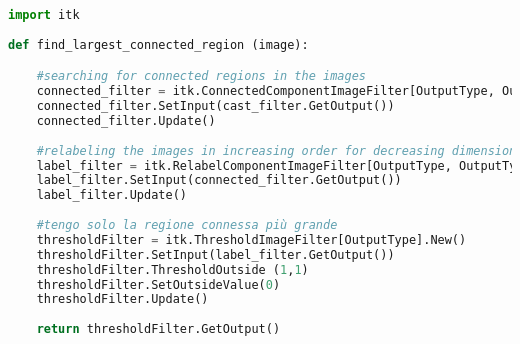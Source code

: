 \documentclass{standalone}
\begin{document}
\lstset{style=python}
	\begin{lstlisting}[language=python, caption = Largest Connected Region Finder, label=find_largest_region]
import itk	
	
def find_largest_connected_region (image):

    #searching for connected regions in the images
    connected_filter = itk.ConnectedComponentImageFilter[OutputType, OutputType].New()
    connected_filter.SetInput(cast_filter.GetOutput())
    connected_filter.Update()
    
    #relabeling the images in increasing order for decreasing dimension
    label_filter = itk.RelabelComponentImageFilter[OutputType, OutputType].New()
    label_filter.SetInput(connected_filter.GetOutput())
    label_filter.Update()
    
    #tengo solo la regione connessa più grande
    thresholdFilter = itk.ThresholdImageFilter[OutputType].New()
    thresholdFilter.SetInput(label_filter.GetOutput())
    thresholdFilter.ThresholdOutside (1,1)
    thresholdFilter.SetOutsideValue(0)
    thresholdFilter.Update()
    
    return thresholdFilter.GetOutput()

\end{lstlisting}
\end{document}

